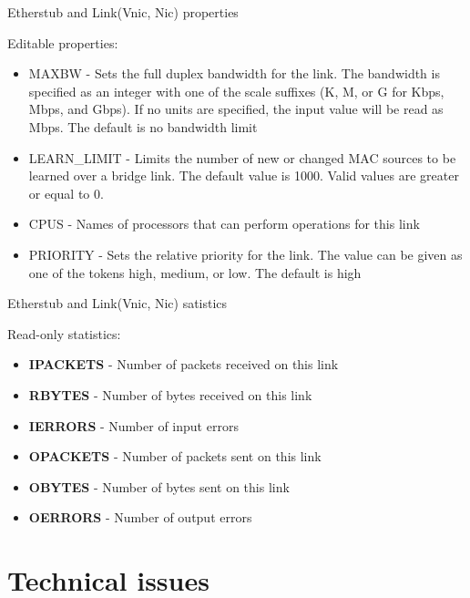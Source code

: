 \documentclass{beamer}
\begin{document}
		\begin{frame}{Etherstub and Link(Vnic, Nic) properties }

			Editable properties:
			
			\begin{itemize}

				\item MAXBW - Sets the full duplex bandwidth for the link. The bandwidth is specified as an integer with one of the scale suffixes (K, M, or G for Kbps, Mbps, and Gbps). If no units are specified, the input value will be read as Mbps. The default is no bandwidth limit
				\item LEARN\_LIMIT - Limits the number of new or changed MAC sources to be learned over a bridge link. The default value is 1000. Valid values are greater or equal to 0.
				\item CPUS - Names of processors that can perform operations for this link
				\item PRIORITY - Sets the relative priority for the link. The value can be given as one of the tokens high, medium, or low. The default is high
			
			\end{itemize}

		\end{frame}

		\begin{frame}{Etherstub and Link(Vnic, Nic) satistics }

			Read-only statistics:
			
			\begin{itemize}

				\item \textbf{IPACKETS} - Number of packets received on this link
				\item \textbf{RBYTES} - Number of bytes received on this link
				\item \textbf{IERRORS} - Number of input errors
				\item \textbf{OPACKETS} - Number of packets sent on this link
				\item \textbf{OBYTES} - Number of bytes sent on this link
				\item \textbf{OERRORS} - Number of output errors
			
			\end{itemize}

		\end{frame}

\section{Technical issues}
\end{document}
